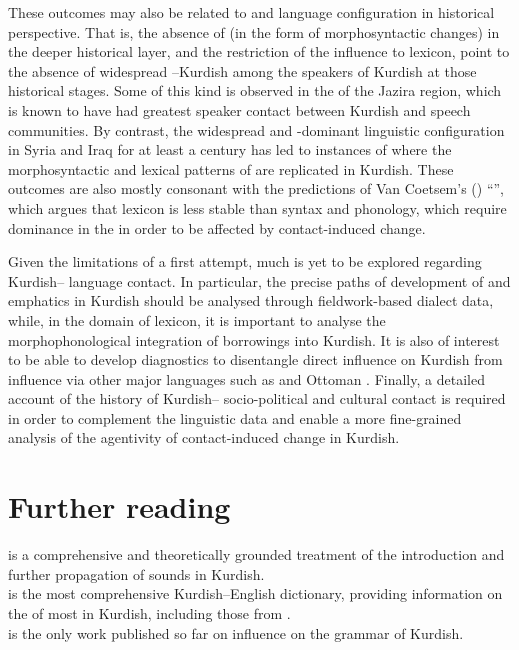 \documentclass[output=paper]{langsci/langscibook}
\begin{document}
These outcomes may also be related to  and language configuration in historical perspective. That is, the absence of  (in the form of morphosyntactic changes) in the deeper historical layer, and the restriction of the influence to lexicon, point to the absence of widespread –Kurdish  among the speakers of Kurdish at those historical stages. Some  of this kind is observed in the  of the Jazira region, which is known to have had greatest speaker contact between Kurdish and  speech communities. By contrast, the widespread  and -dominant linguistic configuration in Syria and Iraq for at least a century has led to instances of  where the morphosyntactic and lexical patterns of  are replicated in Kurdish. These outcomes are also mostly consonant with the predictions of Van Coetsem’s (\citeyear{VanCoetsem1988,VanCoetsem2000}) “”, which argues that lexicon is less stable than syntax and phonology, which require dominance in the  in order to be affected by contact-induced change.    

Given the limitations of a first attempt, much is yet to be explored regarding Kurdish– language contact. In particular, the precise paths of development of  and emphatics in Kurdish should be analysed through fieldwork-based  dialect data, while, in the domain of lexicon, it is important to analyse the morphophonological integration of borrowings into Kurdish. It is also of interest to be able to develop diagnostics to disentangle direct  influence on Kurdish from influence via other major languages such as  and Ottoman . Finally, a detailed account of the history of Kurdish– socio-political and cultural contact is required in order to complement the linguistic data and enable a more fine-grained analysis of the agentivity of contact-induced change in Kurdish.      

\section*{Further reading}
\citet{Barryforthcoming} is a comprehensive and theoretically grounded treatment of the introduction and further propagation of  sounds in Kurdish.\\ 
\citet{Chyet2003} is the most comprehensive Kurdish–English dictionary,  providing information on the  of most  in Kurdish, including those from .\\
\citet{Tsabolov1994} is the only work published so far on  influence on the grammar of Kurdish. 
\end{document}
